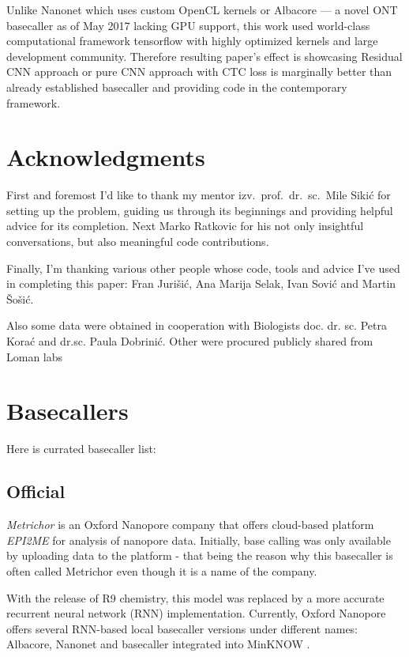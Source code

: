 \documentclass[runningheads,a4paper]{llncs}
\begin{document}
Unlike Nanonet which uses custom OpenCL kernels or Albacore --- a novel ONT basecaller as of May 2017 lacking GPU support, this work used world-class computational framework tensorflow with highly optimized kernels and large development community. Therefore resulting paper's effect is showcasing Residual CNN approach or pure CNN approach with CTC loss is marginally better than already established basecaller and providing code in the contemporary framework.

\section{Acknowledgments}

First and foremost I'd like to thank my mentor izv.~prof.~dr.~sc.~Mile Sikić for setting up the problem, guiding us through its beginnings and providing helpful advice for its completion. Next Marko Ratkovic for his not only insightful conversations, but also meaningful code contributions.

Finally, I'm thanking various other people whose code, tools and advice I've used in completing this paper: Fran Jurišić, Ana Marija Selak, Ivan Sović and Martin Šošić.

Also some data were obtained in cooperation with Biologists doc. dr. sc. Petra Korać and dr.sc. Paula Dobrinić. Other were procured publicly shared from Loman labs~\cite{loman1-100k}

% 


\appendix
\section{Basecallers}\label{app:basecallers}
Here is currated basecaller list:

\subsection{Official}
\textit{Metrichor} is an Oxford Nanopore company that offers cloud-based platform \textit{EPI2ME} for analysis of nanopore data.
Initially, base calling was only available by uploading data to the platform - that being the reason why this basecaller is often called Metrichor even though it is a name of the company.

With the release of R9 chemistry, this model was replaced by a more accurate recurrent neural network (RNN) implementation. Currently, Oxford Nanopore offers several RNN-based local basecaller versions under different names: Albacore, Nanonet and basecaller integrated into MinKNOW \cite{ont-basecallers}.
\end{document}
